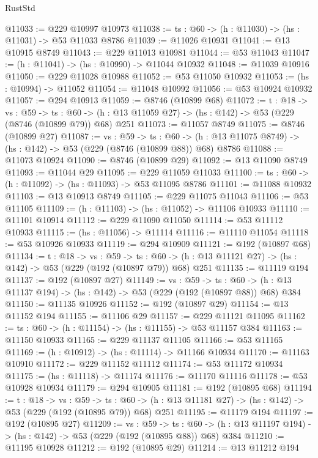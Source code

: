 \begin{lexlean}{RustStd}
\begin{coremodule}
@11033 := @229 @10997 @10973
@11038 := {ts : @60} -> (h : @11030) -> (hs : @11031) -> @53 @11033 @8786
@11039 := @11026 @10931
@11041 := @13 @10915 @8749
@11043 := @229 @11013 @10981
@11044 := @53 @11043
@11047 := (h : @11041) -> (hs : @10990) -> @11044 @10932
@11048 := @11039 @10916
@11050 := @229 @11028 @10988
@11052 := @53 @11050 @10932
@11053 := (hs : @10994) -> @11052
@11054 := @11048 @10992
@11056 := @53 @10924 @10932
@11057 := @294 @10913
@11059 := @8746 (@10899 @68)
@11072 := {t : @18} ->
  {vs : @59} ->
  {ts : @60} -> (h : @13 @11059 @27) -> (hs : @142) -> @53 (@229 (@8746 (@10899 @79)) @68) @251
@11073 := @11057 @8749
@11075 := @8746 (@10899 @27)
@11087 := {vs : @59} ->
  {ts : @60} -> (h : @13 @11075 @8749) -> (hs : @142) -> @53 (@229 (@8746 (@10899 @88)) @68) @8786
@11088 := @11073 @10924
@11090 := @8746 (@10899 @29)
@11092 := @13 @11090 @8749
@11093 := @11044 @29
@11095 := @229 @11059 @11033
@11100 := {ts : @60} -> (h : @11092) -> (hs : @11093) -> @53 @11095 @8786
@11101 := @11088 @10932
@11103 := @13 @10913 @8749
@11105 := @229 @11075 @11043
@11106 := @53 @11105
@11109 := (h : @11103) -> (hs : @11052) -> @11106 @10933
@11110 := @11101 @10914
@11112 := @229 @11090 @11050
@11114 := @53 @11112 @10933
@11115 := (hs : @11056) -> @11114
@11116 := @11110 @11054
@11118 := @53 @10926 @10933
@11119 := @294 @10909
@11121 := @192 (@10897 @68)
@11134 := {t : @18} ->
  {vs : @59} ->
  {ts : @60} -> (h : @13 @11121 @27) -> (hs : @142) -> @53 (@229 (@192 (@10897 @79)) @68) @251
@11135 := @11119 @194
@11137 := @192 (@10897 @27)
@11149 := {vs : @59} ->
  {ts : @60} -> (h : @13 @11137 @194) -> (hs : @142) -> @53 (@229 (@192 (@10897 @88)) @68) @384
@11150 := @11135 @10926
@11152 := @192 (@10897 @29)
@11154 := @13 @11152 @194
@11155 := @11106 @29
@11157 := @229 @11121 @11095
@11162 := {ts : @60} -> (h : @11154) -> (hs : @11155) -> @53 @11157 @384
@11163 := @11150 @10933
@11165 := @229 @11137 @11105
@11166 := @53 @11165
@11169 := (h : @10912) -> (hs : @11114) -> @11166 @10934
@11170 := @11163 @10910
@11172 := @229 @11152 @11112
@11174 := @53 @11172 @10934
@11175 := (hs : @11118) -> @11174
@11176 := @11170 @11116
@11178 := @53 @10928 @10934
@11179 := @294 @10905
@11181 := @192 (@10895 @68)
@11194 := {t : @18} ->
  {vs : @59} ->
  {ts : @60} -> (h : @13 @11181 @27) -> (hs : @142) -> @53 (@229 (@192 (@10895 @79)) @68) @251
@11195 := @11179 @194
@11197 := @192 (@10895 @27)
@11209 := {vs : @59} ->
  {ts : @60} -> (h : @13 @11197 @194) -> (hs : @142) -> @53 (@229 (@192 (@10895 @88)) @68) @384
@11210 := @11195 @10928
@11212 := @192 (@10895 @29)
@11214 := @13 @11212 @194

\end{coremodule}
\end{lexlean}
